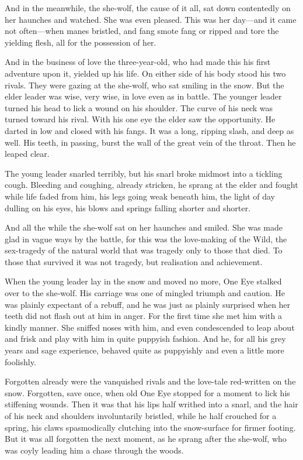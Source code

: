 \documentclass[10pt]{book}
\begin{document}
And in the meanwhile, the she-wolf, the cause of it all, sat down
contentedly on her haunches and watched. She was even pleased. This was
her day—and it came not often—when manes bristled, and fang smote fang
or ripped and tore the yielding flesh, all for the possession of her.

And in the business of love the three-year-old, who had made this his
first adventure upon it, yielded up his life. On either side of his
body stood his two rivals. They were gazing at the she-wolf, who sat
smiling in the snow. But the elder leader was wise, very wise, in love
even as in battle. The younger leader turned his head to lick a wound
on his shoulder. The curve of his neck was turned toward his rival.
With his one eye the elder saw the opportunity. He darted in low and
closed with his fangs. It was a long, ripping slash, and deep as well.
His teeth, in passing, burst the wall of the great vein of the throat.
Then he leaped clear.

The young leader snarled terribly, but his snarl broke midmost into a
tickling cough. Bleeding and coughing, already stricken, he sprang at
the elder and fought while life faded from him, his legs going weak
beneath him, the light of day dulling on his eyes, his blows and
springs falling shorter and shorter.

And all the while the she-wolf sat on her haunches and smiled. She was
made glad in vague ways by the battle, for this was the love-making of
the Wild, the sex-tragedy of the natural world that was tragedy only to
those that died. To those that survived it was not tragedy, but
realisation and achievement.

When the young leader lay in the snow and moved no more, One Eye
stalked over to the she-wolf. His carriage was one of mingled triumph
and caution. He was plainly expectant of a rebuff, and he was just as
plainly surprised when her teeth did not flash out at him in anger. For
the first time she met him with a kindly manner. She sniffed noses with
him, and even condescended to leap about and frisk and play with him in
quite puppyish fashion. And he, for all his grey years and sage
experience, behaved quite as puppyishly and even a little more
foolishly.

Forgotten already were the vanquished rivals and the love-tale
red-written on the snow. Forgotten, save once, when old One Eye stopped
for a moment to lick his stiffening wounds. Then it was that his lips
half writhed into a snarl, and the hair of his neck and shoulders
involuntarily bristled, while he half crouched for a spring, his claws
spasmodically clutching into the snow-surface for firmer footing. But
it was all forgotten the next moment, as he sprang after the she-wolf,
who was coyly leading him a chase through the woods.
\end{document}
